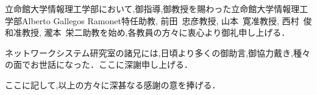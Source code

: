 \documentclass[10pt]{jreport}
\begin{document}
立命館大学情報理工学部において,御指導,御教授を賜わった立命館大学情報理工学部Alberto Gallegos Ramonet特任助教, 前田~忠彦教授, 山本~寛准教授, 西村~俊和准教授, 瀧本~栄二助教を始め,各教員の方々に衷心より御礼申し上げる．


ネットワークシステム研究室の諸兄には,日頃より多くの御助言,御協力戴き,種々の面でお世話になった．ここに深謝申し上げる．

ここに記して,以上の方々に深甚なる感謝の意を捧げる．





\end{document}
